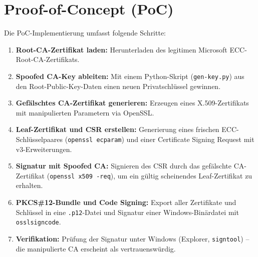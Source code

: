 \documentclass[paper=a4,fontsize=11pt]{scrartcl}
\begin{document}
\section*{Proof-of-Concept (PoC)}
Die PoC-Implementierung umfasst folgende Schritte:
\begin{enumerate}
  \item \textbf{Root-CA-Zertifikat laden:}  
    Herunterladen des legitimen Microsoft ECC-Root-CA-Zertifikats.
  \item \textbf{Spoofed CA-Key ableiten:}  
    Mit einem Python-Skript (\texttt{gen-key.py}) aus den Root-Public-Key-Daten einen neuen Privatschlüssel gewinnen.
  \item \textbf{Gefälschtes CA-Zertifikat generieren:}  
    Erzeugen eines X.509-Zertifikats mit manipulierten Parametern via OpenSSL.
  \item \textbf{Leaf-Zertifikat und CSR erstellen:}  
    Generierung eines frischen ECC-Schlüsselpaares (\texttt{openssl ecparam}) und einer Certificate Signing Request mit v3-Erweiterungen.
  \item \textbf{Signatur mit Spoofed CA:}  
    Signieren des CSR durch das gefälschte CA-Zertifikat (\texttt{openssl x509 -req}), um ein gültig scheinendes Leaf-Zertifikat zu erhalten.
  \item \textbf{PKCS\#12-Bundle und Code Signing:}  
    Export aller Zertifikate und Schlüssel in eine \texttt{.p12}-Datei und Signatur einer Windows-Binärdatei mit \texttt{osslsigncode}.
  \item \textbf{Verifikation:}  
    Prüfung der Signatur unter Windows (Explorer, \texttt{signtool}) – die manipulierte CA erscheint als vertrauenswürdig.
\end{enumerate}
\end{document}
